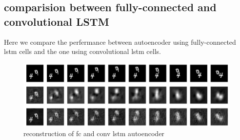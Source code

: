 \documentclass[twoside,a4paper,article]{combine}
\begin{document}
\subsection{comparision between fully-connected and convolutional LSTM}
Here we compare the perfermance between autoencoder using fully-connected lstm cells and the one using convolutional lstm cells.
\begin{figure}[H]
    \includegraphics[width=\linewidth]{compare_fc_conv}
    \caption{reconstruction of fc and conv lstm autoencoder}
    \label{fig:fc-conv}
\end{figure}





\end{document}
